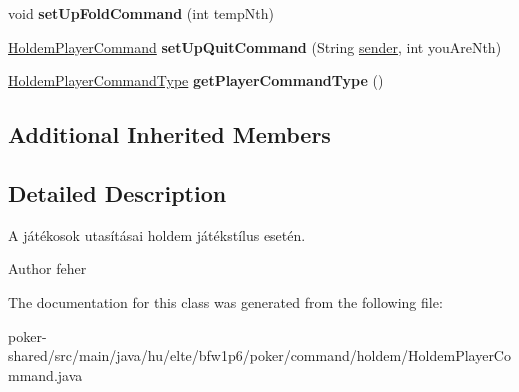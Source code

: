 \begin{DoxyCompactItemize}
\item 
\hypertarget{classhu_1_1elte_1_1bfw1p6_1_1poker_1_1command_1_1holdem_1_1_holdem_player_command_a790673228e18fb69848c0ee0e79ca8a6}{}void {\bfseries set\+Up\+Fold\+Command} (int temp\+Nth)\label{classhu_1_1elte_1_1bfw1p6_1_1poker_1_1command_1_1holdem_1_1_holdem_player_command_a790673228e18fb69848c0ee0e79ca8a6}

\item 
\hypertarget{classhu_1_1elte_1_1bfw1p6_1_1poker_1_1command_1_1holdem_1_1_holdem_player_command_a59cf11ae3f60a37c044c7437e5e04e5c}{}\hyperlink{classhu_1_1elte_1_1bfw1p6_1_1poker_1_1command_1_1holdem_1_1_holdem_player_command}{Holdem\+Player\+Command} {\bfseries set\+Up\+Quit\+Command} (String \hyperlink{classhu_1_1elte_1_1bfw1p6_1_1poker_1_1command_1_1_player_command_aadab45496b9dd59dc734f14e574db2ca}{sender}, int you\+Are\+Nth)\label{classhu_1_1elte_1_1bfw1p6_1_1poker_1_1command_1_1holdem_1_1_holdem_player_command_a59cf11ae3f60a37c044c7437e5e04e5c}

\item 
\hypertarget{classhu_1_1elte_1_1bfw1p6_1_1poker_1_1command_1_1holdem_1_1_holdem_player_command_a36abb7f90d3bb7734a8b2d9a966a2045}{}\hyperlink{enumhu_1_1elte_1_1bfw1p6_1_1poker_1_1command_1_1holdem_1_1type_1_1_holdem_player_command_type}{Holdem\+Player\+Command\+Type} {\bfseries get\+Player\+Command\+Type} ()\label{classhu_1_1elte_1_1bfw1p6_1_1poker_1_1command_1_1holdem_1_1_holdem_player_command_a36abb7f90d3bb7734a8b2d9a966a2045}

\end{DoxyCompactItemize}
\subsection*{Additional Inherited Members}


\subsection{Detailed Description}
A játékosok utasításai holdem játékstílus esetén. \begin{DoxyAuthor}{Author}
feher 
\end{DoxyAuthor}


The documentation for this class was generated from the following file\+:\begin{DoxyCompactItemize}
\item 
poker-\/shared/src/main/java/hu/elte/bfw1p6/poker/command/holdem/Holdem\+Player\+Command.\+java\end{DoxyCompactItemize}

